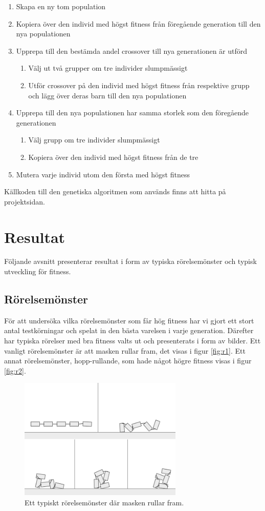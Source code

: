 \documentclass[titlepage, twocolumn, a4paper, 11pt, swedish]{article}
\begin{document}
\begin{enumerate}
\item Skapa en ny tom population
\item Kopiera över den individ med högst fitness från föregående generation till den nya populationen
\item Upprepa till den bestämda andel crossover till nya generationen är utförd
\begin{enumerate}
\item Välj ut två grupper om tre individer slumpmässigt
\item Utför crossover på den individ med högst fitness från respektive grupp och lägg över deras barn till den nya populationen
\end{enumerate}
\item Upprepa till den nya populationen har samma storlek som den föregående generationen
\begin{enumerate}
\item Välj grupp om tre individer slumpmässigt
\item Kopiera över den individ med högst fitness från de tre
\end{enumerate}
\item Mutera varje individ utom den första med högst fitness
\end{enumerate}

Källkoden till den genetiska algoritmen som används finns att hitta på projektsidan.
\section{Resultat}
Följande avsnitt presenterar resultat i form av typiska rörelsemönster och typisk utveckling för fitness.

\subsection{Rörelsemönster}
För att undersöka vilka rörelsemönster som får hög fitness har vi gjort ett stort antal testkörningar och spelat in den bästa varelsen i varje generation. Därefter har typiska rörelser med bra fitness valts ut och presenterats i form av bilder. Ett vanligt rörelsemönster är att masken rullar fram, det visas i figur \vref{fig:r1}. Ett annat rörelsemönster, hopp-rullande, som hade något högre fitness visas i figur \vref{fig:r2}.


\begin{figure}
    \includegraphics[width=78mm]{images/mask1_gs.png}
    \caption{Ett typiskt rörelsemönster där masken rullar fram.}
    \label{fig:r1}
\end{figure}
\end{document}
